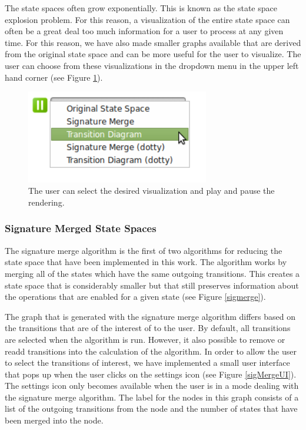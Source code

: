 The state spaces often grow exponentially. This is known as the state space explosion problem. For this reason, a visualization of the entire state space can often be a great deal too much information for a user to process at any given time. For this reason, we have also made smaller graphs available that are derived from the original state space and can be more useful for the user to visualize. The user can choose from these visualizations in the dropdown menu in the upper left hand corner (see Figure \ref{userSelect}).

\begin{center}
\begin{figure}[h!]
\centering
\includegraphics[width=8cm]{bilder/menu.png}
\caption{The user can select the desired visualization and play and pause the rendering.}
\label{userSelect}
\end{figure}
\end{center}

\subsubsection{Signature Merged State Spaces}

The signature merge algorithm is the first of two algorithms for reducing the state space that have been implemented in this work. The algorithm works by merging all of the states which have the same outgoing transitions. This creates a state space that is considerably smaller but that still preserves information about the operations that are enabled for a given state \cite{LeTu05_8} (see Figure \ref{sigmerge}). 

The graph that is generated with the signature merge algorithm differs based on the transitions that are of the interest of to the user. By default, all transitions are selected when the algorithm is run. However, it also possible to remove or readd transitions into the calculation of the algorithm. In order to allow the user to select the transitions of interest, we have implemented a small user interface that pops up when the user clicks on the settings icon (see Figure \ref{sigMergeUI}). The settings icon only becomes available when the user is in a mode dealing with the signature merge algorithm. The label for the nodes in this graph consists of a list of the outgoing transitions from the node and the number of states that have been merged into the node.  

